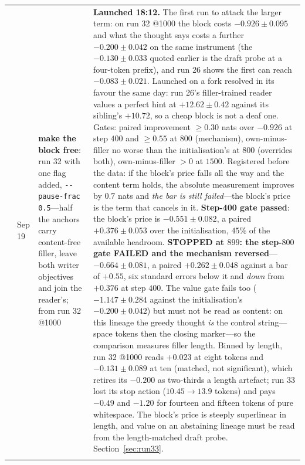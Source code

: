 \documentclass{article} %
\begin{document}
{\begin{longtable}{@{}llp{3.6cm}p{5.6cm}@{}}
\addlinespace
33 & Sep 19 & \textbf{make the block free}: run 32 with one flag added, \texttt{-{}-pause-frac 0.5}---half the anchors carry content-free filler, leave both writer objectives and join the reader's; from run 32 @1000 & \textbf{Launched 18:12.} The first run to attack the larger term: on run 32 @1000 the block costs $-0.926 \pm 0.095$ and what the thought says costs a further $-0.200 \pm 0.042$ on the same instrument (the $-0.130 \pm 0.033$ quoted earlier is the draft probe at a four-token prefix), and run 26 shows the first can reach $-0.083 \pm 0.021$. Launched on a fork resolved in its favour the same day: run 26's filler-trained reader values a perfect hint at $+12.62 \pm 0.42$ against its sibling's $+10.72$, so a cheap block is not a deaf one. Gates: paired improvement $\ge 0.30$ nats over $-0.926$ at step $400$ and $\ge 0.55$ at $800$ (mechanism), own-minus-filler no worse than the initialisation's at $800$ (overrides both), own-minus-filler $>0$ at $1500$. Registered before the data: if the block's price falls all the way and the content term holds, the absolute measurement improves by $0.7$ nats and \emph{the bar is still failed}---the block's price is the term that cancels in it. \textbf{Step-400 gate passed}: the block's price is $-0.551 \pm 0.082$, a paired $+0.376 \pm 0.053$ over the initialisation, $45\%$ of the available headroom. \textbf{STOPPED at $899$: the step-$800$ gate FAILED and the mechanism reversed}---$-0.664 \pm 0.081$, a paired $+0.262 \pm 0.048$ against a bar of $+0.55$, six standard errors below it and \emph{down} from $+0.376$ at step $400$. The value gate fails too ($-1.147 \pm 0.284$ against the initialisation's $-0.200 \pm 0.042$) but must not be read as content: on this lineage the greedy thought \emph{is} the control string---space tokens then the closing marker---so the comparison measures filler length. Binned by length, run 32 @1000 reads $+0.023$ at eight tokens and $-0.131 \pm 0.089$ at ten (matched, not significant), which retires its $-0.200$ as two-thirds a length artefact; run 33 lost its stop action ($10.45 \to 13.9$ tokens) and pays $-0.49$ and $-1.20$ for fourteen and fifteen tokens of pure whitespace. The block's price is steeply superlinear in length, and value on an abstaining lineage must be read from the length-matched draft probe. Section~\ref{sec:run33}. \\
\addlinespace

\end{longtable}}
\end{document}

